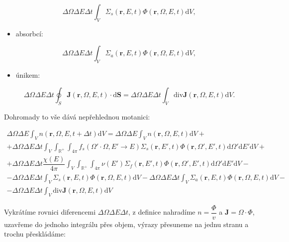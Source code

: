 $$ \Delta \Omega \Delta E \Delta t \int_V  \Sigma_s(\textbf{r}, E, t) \Phi(\textbf{r}, \Omega, E, t) \text{d}V, $$

\begin{itemize}
  \item absorbcí:
\end{itemize}
$$ \Delta \Omega \Delta E \Delta t \int_V  \Sigma_a(\textbf{r}, E, t) \Phi(\textbf{r}, \Omega, E, t) \text{d}V, $$

\begin{itemize}
  \item únikem:
\end{itemize}
$$ \Delta \Omega \Delta E \Delta t \oint_S  \textbf{J}(\textbf{r}, \Omega, E, t) \cdot \text{d}\textbf{S} = \Delta \Omega \Delta E \Delta t \int_V  \text{div} \textbf{J}(\textbf{r}, \Omega, E, t) \text{d}V.$$

Dohromady to vše dává nepřehlednou motanici:

\small
\begin{equation*}
\begin{multlined}
  \Delta \Omega \Delta E \int_V n(\textbf{r}, \Omega, E, t + \Delta t) \text{d}V = \Delta \Omega \Delta E \int_V n(\textbf{r}, \Omega, E, t) \text{d}V + \\
  + \Delta \Omega \Delta E \Delta t \int_V \int_\mathbb{R^+} \int_{4 \pi} f_s(\Omega' \cdot \Omega, E' \rightarrow E) \Sigma_s(\textbf{r}, E', t) \Phi(\textbf{r}, \Omega', E', t) \text{d}\Omega' \text{d}E' \text{d}V + \\
  + \Delta \Omega \Delta E \Delta t \dfrac{\chi(E)}{4 \pi} \int_V \int_\mathbb{R^+} \int_{4 \pi} \nu(E') \Sigma_f(\textbf{r}, E', t) \Phi(\textbf{r}, \Omega', E', t) \text{d}\Omega' \text{d}E' \text{d}V - \\ 
  - \Delta \Omega \Delta E \Delta t \int_V  \Sigma_s(\textbf{r}, E, t) \Phi(\textbf{r}, \Omega, E, t) \text{d}V - \Delta \Omega \Delta E \Delta t \int_V  \Sigma_a(\textbf{r}, E, t) \Phi(\textbf{r}, \Omega, E, t) \text{d}V - \\
  - \Delta \Omega \Delta E \Delta t \int_V  \text{div} \textbf{J}(\textbf{r}, \Omega, E, t) \text{d}V
\end{multlined}
\end{equation*}
\normalsize

Vykrátíme rovnici diferencemi $\Delta \Omega \Delta E \Delta t$, z definice nahradíme $n = \dfrac{\Phi}{v}$ a $\textbf{J} = \Omega \cdot \Phi$, uzavřeme do jednoho integrálu přes objem, výrazy přesuneme na jednu stranu a trochu přeskládáme:

